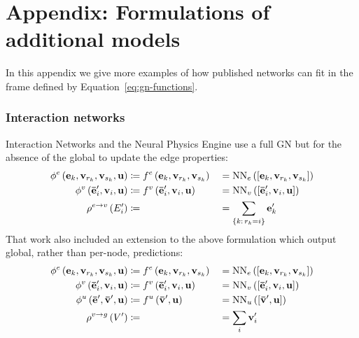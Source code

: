 \appendix
\section*{Appendix: Formulations of additional models}
\label{sec:appendixMoreModels}

In this appendix we give more examples of how published networks can fit in the frame defined by Equation~\ref{eq:gn-functions}.

\subsubsection*{Interaction networks}
Interaction Networks \citep{battaglia2016interaction,watters2017visual} and the Neural Physics Engine \cite{chang2016compositional} use a full GN but for the absence of the global to update the edge properties:
\begin{alignat*}{4}
\phi^e\left(\mathbf{e}_k, \mathbf{v}_{r_k}, \mathbf{v}_{s_k}, \mathbf{u}\right) &\coloneqq f^e\left(\mathbf{e}_k, \mathbf{v}_{r_k}, \mathbf{v}_{s_k}\right) &&= \mathrm{NN}_{e}\left([\mathbf{e}_k, \mathbf{v}_{r_k}, \mathbf{v}_{s_k}]\right) \\
\phi^v\left(\mathbf{\bar{e}}'_i, \mathbf{v}_i, \mathbf{u}\right) &\coloneqq f^v\left(\mathbf{\bar{e}}'_i, \mathbf{v}_i, \mathbf{u}\right) &&= \mathrm{NN}_{v}\left([\mathbf{\bar{e}}'_i, \mathbf{v}_i, \mathbf{u}]\right) \\
\rho^{e\rightarrow v}\left(E'_i\right) &\coloneqq \; &&= \sum_{\{k:\, r_k=i\}} \mathbf{e}'_k \\
\end{alignat*}
That work also included an extension to the above formulation which output global, rather than per-node, predictions:
\begin{alignat*}{4}
\phi^e\left(\mathbf{e}_k, \mathbf{v}_{r_k}, \mathbf{v}_{s_k}, \mathbf{u}\right) &\coloneqq f^e\left(\mathbf{e}_k, \mathbf{v}_{r_k}, \mathbf{v}_{s_k}\right) &&= \mathrm{NN}_{e}\left([\mathbf{e}_k, \mathbf{v}_{r_k}, \mathbf{v}_{s_k}]\right) \\
\phi^v\left(\mathbf{\bar{e}}'_i, \mathbf{v}_i, \mathbf{u}\right) &\coloneqq f^v\left(\mathbf{\bar{e}}'_i, \mathbf{v}_i, \mathbf{u}\right) &&= \mathrm{NN}_{v}\left([\mathbf{\bar{e}}'_i, \mathbf{v}_i, \mathbf{u}]\right) \\
\phi^u\left(\mathbf{\bar{e}}', \mathbf{\bar{v}}', \mathbf{u}\right) &\coloneqq f^u\left(\mathbf{\bar{v}}', \mathbf{u}\right) &&= \mathrm{NN}_{u}\left([\mathbf{\bar{v}}', \mathbf{u}]\right) \\
\rho^{v\rightarrow g}\left(V'\right) &\coloneqq \; &&= \sum_i \mathbf{v}'_i
\end{alignat*}

